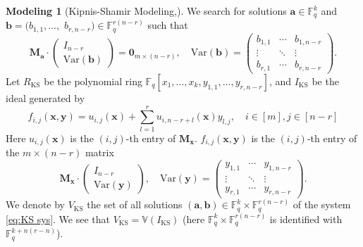 \documentclass[a4paper, 11pt]{amsart}
\newcommand{\mb}[1]{\mathbb{#1}}
\newcommand{\td}[1]{\bm{#1}}
\newcommand{\tx}[1]{\text{#1}}
\newcommand{\fq}{\mathbb{F}_q}
\theoremstyle{definition}
\theoremstyle{definition}
\newtheorem{model}{Modeling}
\begin{document}
	\begin{model}[Kipnis-Shamir Modeling,\cite{KS}]
		We search for solutions $\td{a}\in\fq^k$ and $\td{b}=(b_{1,1},\dots,$ $b_{r,n-r})\in\fq^{r(n-r)}$ such that
		\begin{equation}\label{eq:KS sys}
			\td{M_a}\cdot\begin{pmatrix}
				I_{n-r}\\
				\tx{Var}(\td{b})
			\end{pmatrix}=\td{0}_{m\times (n-r)},\quad\tx{Var}(\td{b})=\begin{pmatrix}
				b_{1,1}&\cdots&b_{1,n-r}\\
				\vdots&\ddots&\vdots\\
				b_{r,1}&\cdots&b_{r,n-r}
			\end{pmatrix}.
		\end{equation}
		Let $R_{\tx{KS}}$ be the polynomial ring $\fq[x_1,\dots,x_k,y_{1,1},\dots,y_{r,n-r}]$, and $I_{\tx{KS}}$ be the ideal generated by
		\begin{equation}\label{eq:KS poly}
			f_{i,j}(\td{x},\td{y})=u_{i,j}(\td{x})+\sum^r_{l=1}u_{i,n-r+l}(\td{x})y_{l,j},\quad i\in[m],j\in[n-r]
		\end{equation}
		Here $u_{i,j}(\td{x})$ is the $(i,j)$-th entry of $\td{M_x}$.
		$f_{i,j}(\td{x},\td{y})$ is the $(i,j)$-th entry of the $m\times (n-r)$ matrix
		\begin{equation*}
			\td{M_x}\cdot\begin{pmatrix}
				I_{n-r}\\
				\tx{Var}(\td{y})
			\end{pmatrix},\quad\tx{Var}(\td{y})=\begin{pmatrix}
				y_{1,1}&\cdots&y_{1,n-r}\\
				\vdots&\ddots&\vdots\\
				y_{r,1}&\cdots&y_{r,n-r}
			\end{pmatrix}.
		\end{equation*}
		We denote by $V_{\tx{KS}}$ the set of all solutions $(\td{a},\td{b})\in\fq^k\times\fq^{r(n-r)}$ of the system \eqref{eq:KS sys}. We see that $V_{\tx{KS}}=\mb{V}(I_{\tx{KS}})$ (here $\fq^k\times\fq^{r(n-r)}$ is identified with $\fq^{k+n(r-n)}$).
	\end{model}
	
\end{document}
